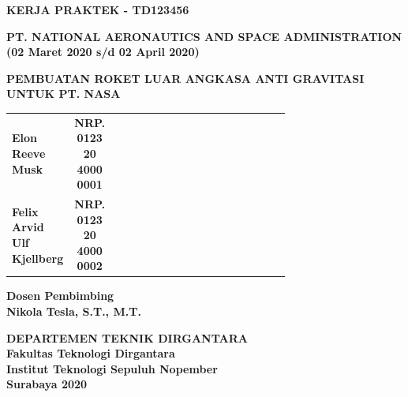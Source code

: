 \begin{flushleft}

  \sffamily
  \color{white}

  \noindent
  \textbf{KERJA PRAKTEK - TD123456}
  \vspace{4ex}

  \noindent
  {\large \textbf{PT. NATIONAL AERONAUTICS AND SPACE ADMINISTRATION}} \\
  \textbf{(02 Maret 2020 s/d 02 April 2020)}
  \vspace{6ex}

  \noindent
  {\large \textbf{PEMBUATAN ROKET LUAR ANGKASA ANTI GRAVITASI UNTUK PT. NASA}}
  \vspace{6ex}

  \begin{adjustwidth}{-0.2cm}{}
    \begin{tabular}{lcp{0.7\linewidth}}
      \textbf{Elon Reeve Musk} & \textbf{NRP. 0123 20 4000 0001} \\
      \textbf{Felix Arvid Ulf Kjellberg} & \textbf{NRP.	0123 20 4000 0002} \\
    \end{tabular}
  \end{adjustwidth}
  \vspace{4ex}

  \noindent
  \textbf{Dosen Pembimbing} \\
  \textbf{Nikola Tesla, S.T., M.T.}
  \vspace{12ex}

  \noindent
  \textbf{DEPARTEMEN TEKNIK DIRGANTARA} \\
  \textbf{Fakultas Teknologi Dirgantara} \\
  \textbf{Institut Teknologi Sepuluh Nopember} \\
  \textbf{Surabaya 2020}

\end{flushleft}

\restoregeometry